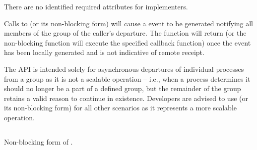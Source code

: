 \begin{arglist}
\end{arglist}

\returnsimple

\reqattrstart
There are no identified required attributes for implementers.
\reqattrend


\descr

Calls to  (or its non-blocking form) will cause a  event to be generated notifying all members of the group of the caller’s departure. The function will return (or the non-blocking function will execute the specified callback function) once the event has been locally generated and is not indicative of remote receipt.

\adviceuserstart
The  API is intended solely for asynchronous departures of individual processes from a group as it is not a scalable operation – i.e., when a process determines it should no longer be a part of a defined group, but the remainder of the group retains a valid reason to continue in existence. Developers are advised to use  (or its non-blocking form) for all other scenarios as it represents a more scalable operation.
\adviceuserend

\subsection{}

\summary

Non-blocking form of .

\format


